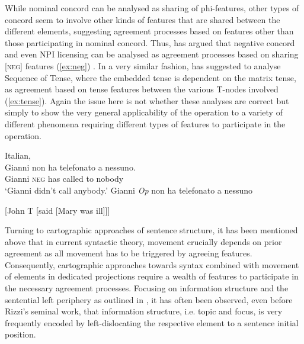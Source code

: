 \documentclass[output=paper
,modfonts
,nonflat]{langsci/langscibook}
\begin{document}
\begin{exe}
	\ex \label{ex:binding}
	\begin{xlist}
	\end{xlist}
	\ex
	\begin{xlist}
		 \label{ex:raising}
		 \label{ex:control}
	\end{xlist}
\end{exe}
While nominal concord can be analysed as sharing of phi-fea\-tures, other types of concord seem to involve other kinds of features that are shared between the different elements, suggesting agreement processes based on features other than those participating in nominal concord. Thus, \citet{zeijlstra2004} has argued that negative concord and even NPI licensing can be analysed as agreement processes based on sharing [\textsc{neg}] features (\ref{ex:neg}) \citep{haegemanzanuttini1991}. In a very similar fashion, \citet{Zeijlstra2012} has suggested to analyse Sequence of Tense, where the embedded tense is dependent on the matrix tense, as agreement based on tense features between the various T-nodes involved (\ref{ex:tense}).
Again the issue here is not whether these analyses are correct but simply to show the very general applicability of the operation {\agr} to a variety of different phenomena requiring different types of features to participate in the operation.

\begin{exe}
	\ex \label{ex:neg}
	\begin{xlist}
		\ex	 Italian, \citep{zeijlstra2004}\\
		\gll Gianni non ha telefonato a nessuno.\\
		Gianni \textsc{neg} has called to nobody\\
		\glt `Gianni didn’t call anybody.'
		\ex Gianni \textit{Op} non ha telefonato a  nessuno\sub{[\textsc{neg}]}
	\end{xlist}
\end{exe}

\begin{exe}
	\ex \label{ex:tense} {[}John T  [said [Mary was ill]]] \hfill \citep{Zeijlstra2012}
\end{exe}
Turning to cartographic approaches of sentence structure, it has been mentioned above that in current syntactic theory, movement crucially depends on prior agreement as all movement has to be triggered by agreeing features. Consequently, cartographic approaches towards syntax combined with movement of elements in dedicated projections require a wealth of features to participate in the necessary agreement processes. Focusing on information structure and the sentential left periphery as outlined in \citet{Rizzi1997}, it has often been observed, even before Rizzi's seminal work, that information structure, i.e. topic and focus, is very frequently encoded by left-dislocating the respective element to a sentence initial position.
\end{document}
